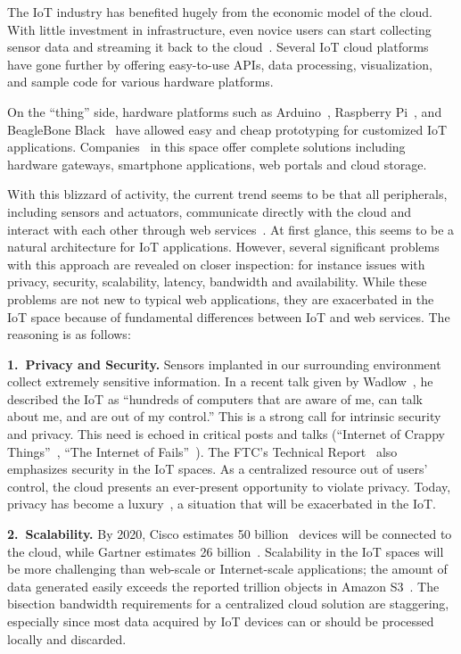 The IoT industry has benefited hugely from the economic model of the cloud.
With little investment in infrastructure, even novice users can start collecting
sensor data and streaming it back to the cloud~\cite{armbrust2010view}.  Several
IoT cloud platforms~\cite{carriots, grovestreams, xively, sami} have gone
further by offering easy-to-use APIs, data processing, visualization, and sample
code for various hardware platforms.

On the ``thing'' side, hardware platforms such as Arduino~\cite{arduino},
Raspberry Pi~\cite{rpi}, and BeagleBone Black~\cite{bbb} have allowed easy and
cheap prototyping for customized IoT applications.  Companies~\cite{ninja,
  smartthings, wink} in this space offer complete solutions including hardware
gateways, smartphone applications, web portals and cloud storage.

With this blizzard of activity, the current trend seems to be that all
peripherals, including sensors and actuators, communicate directly with the
cloud and interact with each other through web services~\cite{lee2014swarm}.  At
first glance, this seems to be a natural architecture for IoT applications.
However, several significant problems with this approach are revealed on closer
inspection: for instance issues with privacy, security, scalability, latency,
bandwidth and availability.  While these problems are not new to typical web
applications, they are exacerbated in the IoT space because of fundamental
differences between IoT and web services. The reasoning is as follows:

\noindent\textbf{1.~Privacy and Security.} Sensors
implanted in our surrounding environment collect extremely sensitive
information.  In a recent talk given by Wadlow~\cite{wadlow}, he described the
IoT as ``hundreds of computers that are aware of me, can talk about me, and are
out of my control.''  This is a strong call for intrinsic security and privacy.
This need is echoed in critical posts and talks (``Internet of Crappy
Things''~\cite{alex2015internet}, ``The Internet of
Fails''~\cite{stanislav2014the}).  The FTC's Technical
Report~\cite{ftc2015internet} also emphasizes security in the IoT spaces.  As a
centralized resource out of users' control, the cloud presents an ever-present
opportunity to violate privacy.  Today, privacy has become a
luxury~\cite{angwin2014has}, a situation that will be exacerbated in the IoT.

\noindent\textbf{2.~Scalability.} By 2020, Cisco estimates 50
billion~\cite{evans2011internet} devices will be connected to the cloud,
while Gartner estimates 26 billion~\cite{middleton2013forecast}. Scalability in
the IoT spaces will be more challenging than web-scale or Internet-scale
applications; the amount of data generated easily exceeds the reported trillion
objects in Amazon S3~\cite{barr2013amazon}. The bisection bandwidth requirements
for a centralized cloud solution are staggering, especially since most
data acquired by IoT devices can or should be processed locally and discarded.

